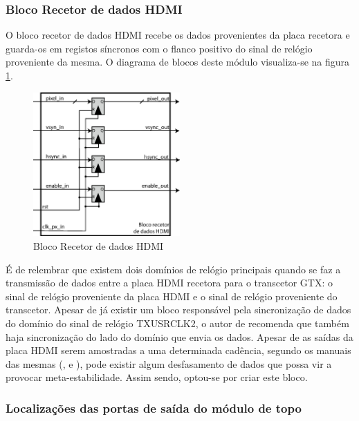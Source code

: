 \documentclass[11pt,a4paper]{article}
\begin{document}
	\subsubsection*{Bloco Recetor de dados HDMI}
	O bloco recetor de dados HDMI recebe os dados provenientes da placa recetora e guarda-os em registos síncronos com o flanco positivo do sinal de relógio proveniente da mesma. O diagrama de blocos deste módulo visualiza-se na figura \ref{fig:recetorHDMI}.
	\begin{figure}[h!]
		\begin{center}
			\leavevmode
			\includegraphics[width=0.5\textwidth]{recetorHDMI}
			\caption[Bloco recetor de dados HDMI]{Bloco Recetor de dados HDMI}
			\label{fig:recetorHDMI}
		\end{center}
	\end{figure}
	
	É de relembrar que existem dois domínios de relógio principais quando se faz a transmissão de dados entre a placa HDMI recetora para o transcetor GTX: o sinal de relógio proveniente da placa HDMI e o sinal de relógio proveniente do transcetor. Apesar de já existir um bloco responsável pela sincronização de dados do domínio do sinal de relógio TXUSRCLK2, o autor de \cite{R024} recomenda que também haja sincronização do lado do domínio que envia os dados. Apesar de as saídas da placa HDMI serem amostradas a uma determinada cadência, segundo os manuais das mesmas (\cite{R009}, \cite{R014} e \cite{R013}), pode existir algum desfasamento de dados que possa vir a provocar meta-estabilidade. Assim sendo, optou-se por criar este bloco.
	
	\subsubsection*{Localizações das portas de saída do módulo de topo} \label{subsub:serial_locs_planE}
\end{document}
